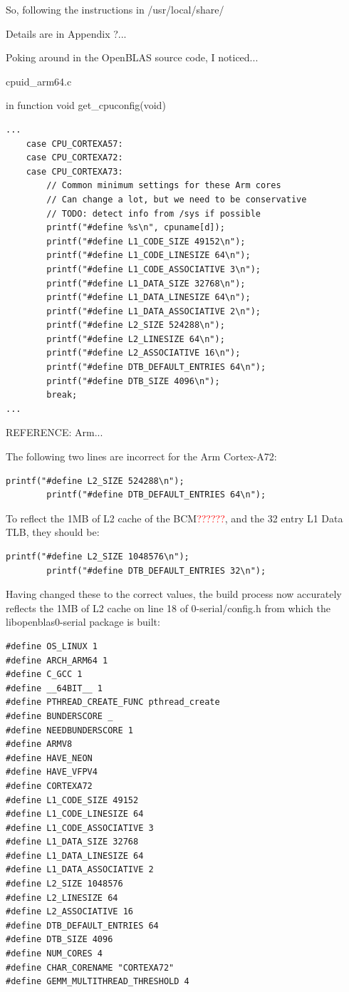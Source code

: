 \documentclass{report}
\begin{document}
So, following the instructions in /usr/local/share/

Details are in Appendix ?...

Poking around in the OpenBLAS source code, I noticed...

cpuid\_arm64.c

in function void get\_cpuconfig(void)


\lstset{style=listingstyle}
\begin{lstlisting}[caption=cpuid\_arm64.c, numbers=none]
...
	case CPU_CORTEXA57:
	case CPU_CORTEXA72:
	case CPU_CORTEXA73:
		// Common minimum settings for these Arm cores
		// Can change a lot, but we need to be conservative
		// TODO: detect info from /sys if possible
		printf("#define %s\n", cpuname[d]);
		printf("#define L1_CODE_SIZE 49152\n");
		printf("#define L1_CODE_LINESIZE 64\n");
		printf("#define L1_CODE_ASSOCIATIVE 3\n");
		printf("#define L1_DATA_SIZE 32768\n");
		printf("#define L1_DATA_LINESIZE 64\n");
		printf("#define L1_DATA_ASSOCIATIVE 2\n");
		printf("#define L2_SIZE 524288\n");
		printf("#define L2_LINESIZE 64\n");
		printf("#define L2_ASSOCIATIVE 16\n");
		printf("#define DTB_DEFAULT_ENTRIES 64\n");
		printf("#define DTB_SIZE 4096\n");
		break;
...
\end{lstlisting}

REFERENCE: Arm...

The following two lines are incorrect for the Arm Cortex-A72:

\lstset{style=listingstyle}
\begin{lstlisting}[numbers=none]
		printf("#define L2_SIZE 524288\n");
		printf("#define DTB_DEFAULT_ENTRIES 64\n");
\end{lstlisting}

To reflect the 1MB of L2 cache of the BCM\textcolor{red}{??????}, and the 32 entry L1 Data TLB, they should be:

\lstset{style=listingstyle}
\begin{lstlisting}[numbers=none]
		printf("#define L2_SIZE 1048576\n");
		printf("#define DTB_DEFAULT_ENTRIES 32\n");
\end{lstlisting}


Having changed these to the correct values, the build process now accurately reflects the 1MB of L2 cache on line 18 of 0-serial/config.h from which the libopenblas0-serial package is built:


\lstset{style=listingstyle}
\begin{lstlisting}[caption=0-serial/config.h]
#define OS_LINUX 1
#define ARCH_ARM64 1
#define C_GCC 1
#define __64BIT__ 1
#define PTHREAD_CREATE_FUNC pthread_create
#define BUNDERSCORE _
#define NEEDBUNDERSCORE 1
#define ARMV8
#define HAVE_NEON
#define HAVE_VFPV4
#define CORTEXA72
#define L1_CODE_SIZE 49152
#define L1_CODE_LINESIZE 64
#define L1_CODE_ASSOCIATIVE 3
#define L1_DATA_SIZE 32768
#define L1_DATA_LINESIZE 64
#define L1_DATA_ASSOCIATIVE 2
#define L2_SIZE 1048576
#define L2_LINESIZE 64
#define L2_ASSOCIATIVE 16
#define DTB_DEFAULT_ENTRIES 64
#define DTB_SIZE 4096
#define NUM_CORES 4
#define CHAR_CORENAME "CORTEXA72"
#define GEMM_MULTITHREAD_THRESHOLD 4
\end{lstlisting}
\end{document}
